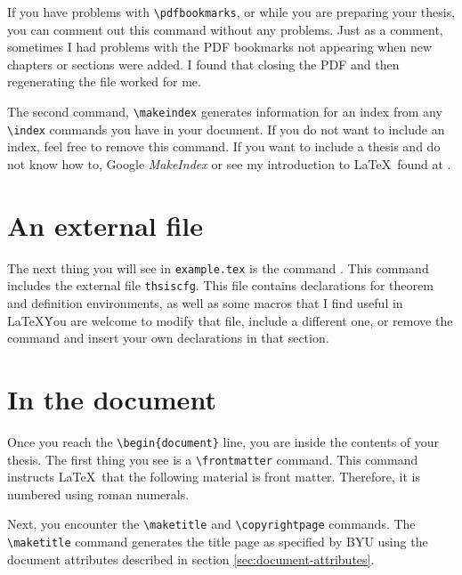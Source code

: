 \documentclass[12pt]{thesis}
\begin{document}
If you have problems with \verb=\pdfbookmarks=, or while you are preparing your thesis, you can comment out this command without any problems. Just as a comment, sometimes I had problems with the PDF bookmarks not appearing when new chapters or sections were added. I found that closing the PDF and then regenerating the file worked for me.

The second command, \verb=\makeindex= generates information for an index from any \verb=\index= commands you have in your document. If you do not want to include an index, feel free to remove this command. If you want to include a thesis and do not know how to, Google \textit{MakeIndex} or see my introduction to \LaTeX\, found at \cite{computation-page}.

\section{An external file}
The next thing you will see in \texttt{example.tex} is the command \verb==. This command includes the external file \texttt{thsiscfg}. This file contains declarations for theorem and definition environments, as well as some macros that I find useful in \LaTeX\. You are welcome to modify that file, include a different one, or remove the \verb== command and insert your own declarations in that section.

\section{In the document}
Once you reach the \verb=\begin{document}= line, you are inside the contents of your thesis. The first thing you see is a \verb=\frontmatter= command. This command instructs \LaTeX\ that the following material is front matter. Therefore, it is numbered using roman numerals.

Next, you encounter the \verb=\maketitle= and \verb=\copyrightpage= commands. The \verb=\maketitle= command generates the title page as specified by BYU using the document attributes described in section \ref{sec:document-attributes}. 
\end{document}
